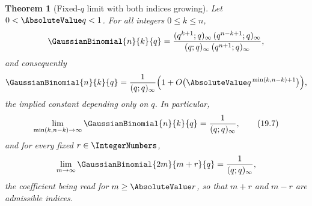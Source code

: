 \documentclass[11pt,a4paper,oneside,openany]{book}
\newtheorem{theorem}{Theorem}[chapter]
\theoremstyle{definition}
\theoremstyle{remark}
\begin{document}
\begin{theorem}[Fixed-$q$ limit with both indices growing]\label{thm:central-fixed-q}
Let $0<\AbsoluteValue q<1$.  For all integers $0\le k\le n$,
\[
 \GaussianBinomial{n}{k}{q}
 =\frac{(q^{k+1};q)_\infty\,(q^{n-k+1};q)_\infty}
       {(q;q)_\infty\,(q^{n+1};q)_\infty},
\]
and consequently
\[
 \GaussianBinomial{n}{k}{q}
 =\frac1{(q;q)_\infty}
 \Bigl(1+O\bigl(\AbsoluteValue q^{\,\min(k,n-k)+1}\bigr)\Bigr),
\]
the implied constant depending only on $q$.  In particular,
\[
 \lim_{\min(k,n-k)\to\infty}\GaussianBinomial{n}{k}{q}=\frac1{(q;q)_\infty},
 \tag{19.7}\label{eq:central-fixed-q}
\]
and for every fixed $r\in\IntegerNumbers$,
\[
 \lim_{m\to\infty}\GaussianBinomial{2m}{m+r}{q}=\frac1{(q;q)_\infty},
\]
the coefficient being read for $m\ge\AbsoluteValue r$, so that $m+r$ and $m-r$ are
admissible indices.
\end{theorem}
\end{document}
